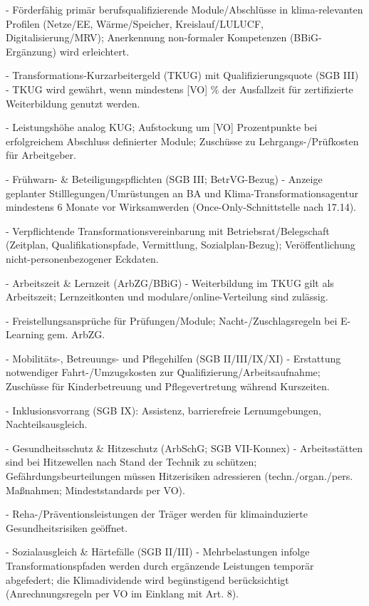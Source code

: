 \documentclass[12pt,a4paper]{scrartcl}
\begin{document}
- Förderfähig primär berufsqualifizierende Module/Abschlüsse in klima-relevanten Profilen (Netze/EE, Wärme/Speicher, Kreislauf/LULUCF, Digitalisierung/MRV); Anerkennung non-formaler Kompetenzen (BBiG-Ergänzung) wird erleichtert.

- Transformations-Kurzarbeitergeld (TKUG) mit Qualifizierungsquote (SGB III)
- TKUG wird gewährt, wenn mindestens [VO] \% der Ausfallzeit für zertifizierte Weiterbildung genutzt werden.

- Leistungshöhe analog KUG; Aufstockung um [VO] Prozentpunkte bei erfolgreichem Abschluss definierter Module; Zuschüsse zu Lehrgangs-/Prüfkosten für Arbeitgeber.

- Frühwarn- \& Beteiligungspflichten (SGB III; BetrVG-Bezug)
- Anzeige geplanter Stilllegungen/Umrüstungen an BA und Klima-Transformationsagentur mindestens 6 Monate vor Wirksamwerden (Once-Only-Schnittstelle nach 17.14).

- Verpflichtende Transformationsvereinbarung mit Betriebsrat/Belegschaft (Zeitplan, Qualifikationspfade, Vermittlung, Sozialplan-Bezug); Veröffentlichung nicht-personenbezogener Eckdaten.

- Arbeitszeit \& Lernzeit (ArbZG/BBiG)
- Weiterbildung im TKUG gilt als Arbeitszeit; Lernzeitkonten und modulare/online-Verteilung sind zulässig.

- Freistellungsansprüche für Prüfungen/Module; Nacht-/Zuschlagsregeln bei E-Learning gem. ArbZG.

- Mobilitäts-, Betreuungs- und Pflegehilfen (SGB II/III/IX/XI)
- Erstattung notwendiger Fahrt-/Umzugskosten zur Qualifizierung/Arbeitsaufnahme; Zuschüsse für Kinderbetreuung und Pflegevertretung während Kurszeiten.

- Inklusionsvorrang (SGB IX): Assistenz, barrierefreie Lernumgebungen, Nachteilsausgleich.

- Gesundheitsschutz \& Hitzeschutz (ArbSchG; SGB VII-Konnex)
- Arbeitsstätten sind bei Hitzewellen nach Stand der Technik zu schützen; Gefährdungsbeurteilungen müssen Hitzerisiken adressieren (techn./organ./pers. Maßnahmen; Mindeststandards per VO).

- Reha-/Präventionsleistungen der Träger werden für klimainduzierte Gesundheitsrisiken geöffnet.

- Sozialausgleich \& Härtefälle (SGB II/III)
- Mehrbelastungen infolge Transformationspfaden werden durch ergänzende Leistungen temporär abgefedert; die Klimadividende wird begünstigend berücksichtigt (Anrechnungsregeln per VO im Einklang mit Art. 8).
\end{document}
